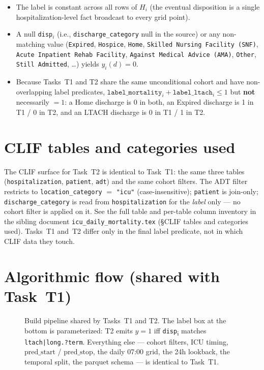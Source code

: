 \documentclass[11pt]{article}
\newcommand{\predstart}{\text{pred\_start}}
\newcommand{\predstop}{\text{pred\_stop}}
\begin{document}
\begin{itemize}[leftmargin=2em]
  \item The label is constant across all rows of $H_i$ (the eventual
        disposition is a single hospitalization-level fact broadcast
        to every grid point).
  \item A null \texttt{disp}$_i$ (i.e., \texttt{discharge\_category}
        null in the source) or any non-matching value
        (\texttt{Expired}, \texttt{Hospice}, \texttt{Home},
        \texttt{Skilled Nursing Facility (SNF)},
        \texttt{Acute Inpatient Rehab Facility},
        \texttt{Against Medical Advice (AMA)}, \texttt{Other},
        \texttt{Still Admitted}, \ldots) yields $y_i(d) = 0$.
  \item Because Tasks~T1 and T2 share the same unconditional cohort
        and have non-overlapping label predicates,
        $\texttt{label\_mortality}_i + \texttt{label\_ltach}_i \le 1$
        but \textbf{not} necessarily $= 1$: a Home discharge is 0 in
        both, an Expired discharge is 1 in T1 / 0 in T2, and an
        LTACH discharge is 0 in T1 / 1 in T2.
\end{itemize}

\section{CLIF tables and categories used}

The CLIF surface for Task~T2 is identical to Task~T1: the same three
tables (\texttt{hospitalization}, \texttt{patient}, \texttt{adt}) and
the same cohort filters. The ADT filter restricts to
\texttt{location\_category} $=$ \texttt{"icu"} (case-insensitive);
\texttt{patient} is join-only; \texttt{discharge\_category} is read
from \texttt{hospitalization} for the \emph{label} only --- no cohort
filter is applied on it. See the full table and per-table column
inventory in the sibling document \texttt{icu\_daily\_mortality.tex}
(\S CLIF tables and categories used). Tasks~T1 and~T2 differ only in
the final label predicate, not in which CLIF data they touch.

\section{Algorithmic flow (shared with Task~T1)}

\begin{figure}[H]
\centering

\caption{Build pipeline shared by Tasks~T1 and T2. The label box at
the bottom is parameterized: T2 emits $y = 1$ iff
\texttt{disp}\textsubscript{i} matches \texttt{ltach|long.?term}.
Everything else --- cohort filters, ICU timing, $\predstart$ /
$\predstop$, the daily 07:00 grid, the 24h lookback, the temporal
split, the parquet schema --- is identical to Task~T1.}
\label{fig:t2-flow}
\end{figure}
\end{document}
